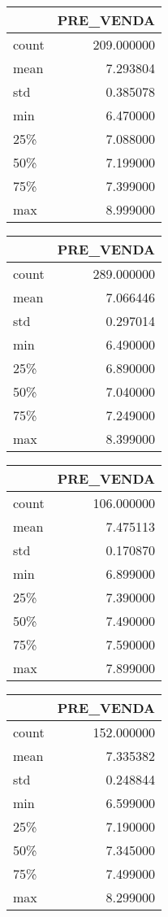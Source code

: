 \begin{tabular}{lr}
\toprule
{} &   PRE\_VENDA \\
\midrule
count &  209.000000 \\
mean  &    7.293804 \\
std   &    0.385078 \\
min   &    6.470000 \\
25\%   &    7.088000 \\
50\%   &    7.199000 \\
75\%   &    7.399000 \\
max   &    8.999000 \\
\bottomrule
\end{tabular}

\begin{tabular}{lr}
\toprule
{} &   PRE\_VENDA \\
\midrule
count &  289.000000 \\
mean  &    7.066446 \\
std   &    0.297014 \\
min   &    6.490000 \\
25\%   &    6.890000 \\
50\%   &    7.040000 \\
75\%   &    7.249000 \\
max   &    8.399000 \\
\bottomrule
\end{tabular}
\begin{tabular}{lr}
\toprule
{} &   PRE\_VENDA \\
\midrule
count &  106.000000 \\
mean  &    7.475113 \\
std   &    0.170870 \\
min   &    6.899000 \\
25\%   &    7.390000 \\
50\%   &    7.490000 \\
75\%   &    7.590000 \\
max   &    7.899000 \\
\bottomrule
\end{tabular}

\begin{tabular}{lr}
\toprule
{} &   PRE\_VENDA \\
\midrule
count &  152.000000 \\
mean  &    7.335382 \\
std   &    0.248844 \\
min   &    6.599000 \\
25\%   &    7.190000 \\
50\%   &    7.345000 \\
75\%   &    7.499000 \\
max   &    8.299000 \\
\bottomrule
\end{tabular}
